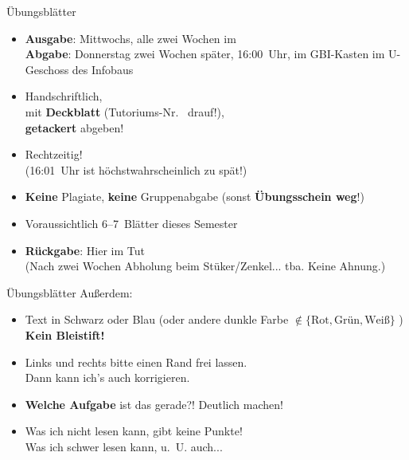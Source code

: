 \begin{frame}{Übungsblätter}
	\begin{itemize}
		\item \textbf{Ausgabe}: Mittwochs, alle zwei Wochen im \ILIAS \\
			  \textbf{Abgabe}: Donnerstag zwei Wochen später, 16:00~Uhr, im GBI-Kasten im U-Geschoss des Infobaus
		\item Handschriftlich, \\ 
		mit \textbf{Deckblatt} (Tutoriums-Nr. \mytutnumber\  drauf!), \\ 
		\textbf{getackert} abgeben!
		\item Rechtzeitig! \\(16:01~Uhr ist höchstwahrscheinlich zu spät!)
		\item \textbf{Keine} Plagiate, \textbf{keine} Gruppenabgabe (sonst \textbf{Übungsschein weg}!) 
		\item Voraussichtlich 6--7~Blätter dieses Semester
		\item \textbf{Rückgabe}: Hier im Tut \\ (Nach zwei Wochen Abholung beim Stüker/Zenkel... tba. Keine Ahnung.) %
	\end{itemize}
	
\end{frame}

\begin{frame}{Übungsblätter}
	Außerdem:
	\begin{itemize}
		\item Text in Schwarz oder Blau (oder andere dunkle Farbe $\notin \{\text{Rot}, \text{Grün}, \text{Weiß}\}$ ) \\
			  \textbf{Kein Bleistift!}
		\item Links und rechts bitte einen Rand frei lassen. \\
			  Dann kann ich's auch korrigieren. \smiley
		\item \textbf{Welche Aufgabe} ist das gerade?! \impl Deutlich machen!
		\item Was ich nicht lesen kann, gibt keine Punkte! \\
			  \small Was ich schwer lesen kann, u.~U. auch... 
	\end{itemize}
\end{frame}



